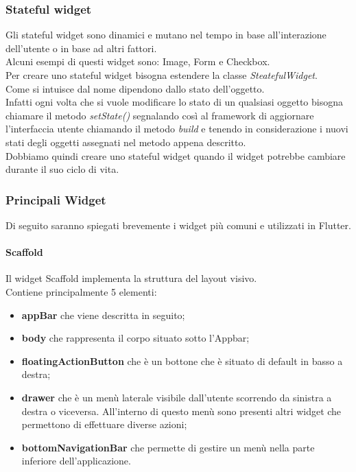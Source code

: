 \subsubsection{Stateful widget}
Gli stateful widget sono dinamici e mutano nel tempo in base all'interazione dell'utente o in base ad altri fattori.\\
Alcuni esempi di questi widget sono: Image, Form e Checkbox.\\
Per creare uno stateful widget bisogna estendere la classe \textit{SteatefulWidget}.\\
Come si intuisce dal nome dipendono dallo stato dell'oggetto.\\
Infatti ogni volta che si vuole modificare lo stato di un qualsiasi oggetto bisogna chiamare il metodo \textit{setState()} segnalando così al framework di aggiornare l'interfaccia utente chiamando il metodo \textit{build} e tenendo in considerazione i nuovi stati degli oggetti assegnati nel metodo appena descritto. \\
Dobbiamo quindi creare uno stateful widget quando il widget potrebbe cambiare durante il suo ciclo di vita. 

\newpage

\subsubsection{Principali Widget}
Di seguito saranno spiegati brevemente i widget più comuni e utilizzati in Flutter.

\paragraph{Scaffold}
Il widget Scaffold \cite{scaffold} implementa la struttura del layout visivo.\\
Contiene principalmente 5 elementi:
\begin{itemize}
	\item \textbf{appBar} che viene descritta in seguito;   
	\item \textbf{body} che rappresenta il corpo situato sotto l'Appbar;
	\item \textbf{floatingActionButton} che è un bottone che è situato di default in basso a destra;   
	\item \textbf{drawer} che è un menù laterale visibile dall'utente scorrendo da sinistra a destra o viceversa. All'interno di questo menù sono presenti altri widget che permettono di effettuare diverse azioni;
	\item \textbf{bottomNavigationBar} che permette di gestire un menù nella parte inferiore dell'applicazione.
\end{itemize}

